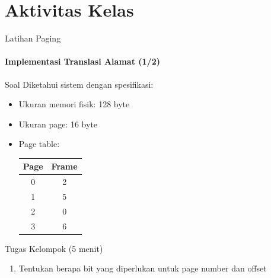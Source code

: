 \documentclass[10pt,aspectratio=169]{beamer}
\begin{document}
\section{Aktivitas Kelas}

\begin{frame}{Latihan Paging}
    \framesubtitle{Implementasi Translasi Alamat (1/2)}
    
    \begin{block}{Soal}
        Diketahui sistem dengan spesifikasi:
        \begin{itemize}
            \item Ukuran memori fisik: 128 byte
            \item Ukuran page: 16 byte
            \item Page table: 
            \begin{center}
            \begin{tabular}{|c|c|}
            \hline
            \textbf{Page} & \textbf{Frame} \\
            \hline
            0 & 2 \\
            \hline
            1 & 5 \\
            \hline
            2 & 0 \\
            \hline
            3 & 6 \\
            \hline
            \end{tabular}
            \end{center}      \end{itemize}
    \end{block}
    
    \begin{alertblock}{Tugas Kelompok (5 menit)}
        \begin{enumerate}
            \item Tentukan berapa bit yang diperlukan untuk page number dan offset
        \end{enumerate}
    \end{alertblock}
\end{frame}
\end{document}
